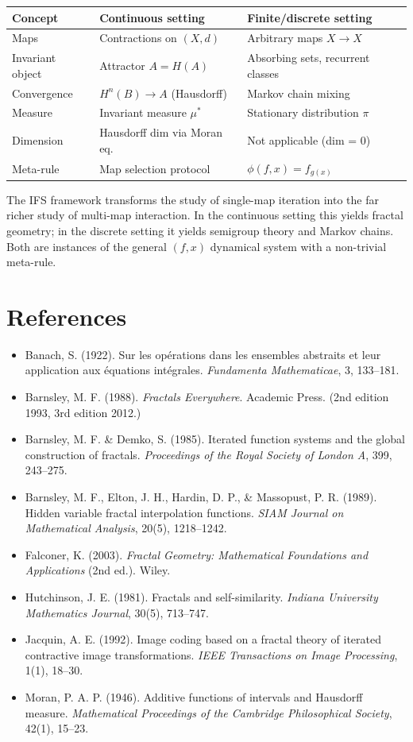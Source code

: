 \begin{tabular}{|l|l|l|}
\hline
Concept & Continuous setting & Finite/discrete setting \\
\hline
Maps & Contractions on $(X, d)$ & Arbitrary maps $X \to X$ \\
Invariant object & Attractor $A = H(A)$ & Absorbing sets, recurrent classes \\
Convergence & $H^n(B) \to A$ (Hausdorff) & Markov chain mixing \\
Measure & Invariant measure $\mu^*$ & Stationary distribution $\pi$ \\
Dimension & Hausdorff dim via Moran eq. & Not applicable (dim = 0) \\
Meta-rule & Map selection protocol & $\phi(f, x) = f_{g(x)}$ \\
\hline
\end{tabular}


The IFS framework transforms the study of single-map iteration into the far richer study of multi-map interaction. In the continuous setting this yields fractal geometry; in the discrete setting it yields semigroup theory and Markov chains. Both are instances of the general $(f, x)$ dynamical system with a non-trivial meta-rule.

\section{References}

\begin{itemize}
  \item Banach, S. (1922). Sur les opérations dans les ensembles abstraits et leur application aux équations intégrales. \textit{Fundamenta Mathematicae}, 3, 133–181.
  \item Barnsley, M. F. (1988). \textit{Fractals Everywhere}. Academic Press. (2nd edition 1993, 3rd edition 2012.)
  \item Barnsley, M. F. & Demko, S. (1985). Iterated function systems and the global construction of fractals. \textit{Proceedings of the Royal Society of London A}, 399, 243–275.
  \item Barnsley, M. F., Elton, J. H., Hardin, D. P., & Massopust, P. R. (1989). Hidden variable fractal interpolation functions. \textit{SIAM Journal on Mathematical Analysis}, 20(5), 1218–1242.
  \item Falconer, K. (2003). \textit{Fractal Geometry: Mathematical Foundations and Applications} (2nd ed.). Wiley.
  \item Hutchinson, J. E. (1981). Fractals and self-similarity. \textit{Indiana University Mathematics Journal}, 30(5), 713–747.
  \item Jacquin, A. E. (1992). Image coding based on a fractal theory of iterated contractive image transformations. \textit{IEEE Transactions on Image Processing}, 1(1), 18–30.
  \item Moran, P. A. P. (1946). Additive functions of intervals and Hausdorff measure. \textit{Mathematical Proceedings of the Cambridge Philosophical Society}, 42(1), 15–23.
\end{itemize}
